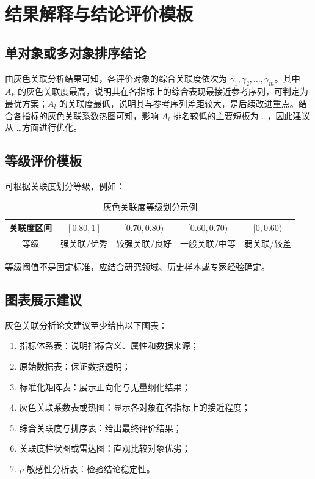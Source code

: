 \documentclass[UTF8,a4paper,11pt]{ctexart}
\begin{document}
\section{结果解释与结论评价模板}
\subsection{单对象或多对象排序结论}
\begin{notebox}[综合排序结论模板]
由灰色关联分析结果可知，各评价对象的综合关联度依次为 $\gamma_1,\gamma_2,\ldots,\gamma_m$。其中 $A_k$ 的灰色关联度最高，说明其在各指标上的综合表现最接近参考序列，可判定为最优方案；$A_l$ 的关联度最低，说明其与参考序列差距较大，是后续改进重点。结合各指标的灰色关联系数热图可知，影响 $A_l$ 排名较低的主要短板为 \ldots，因此建议从 \ldots 方面进行优化。
\end{notebox}

\subsection{等级评价模板}
可根据关联度划分等级，例如：
\begin{table}[h]
\centering
\caption{灰色关联度等级划分示例}
\begin{tabular}{ccccc}
\toprule
关联度区间 & $[0.80,1]$ & $[0.70,0.80)$ & $[0.60,0.70)$ & $[0,0.60)$ \\
\midrule
等级 & 强关联/优秀 & 较强关联/良好 & 一般关联/中等 & 弱关联/较差 \\
\bottomrule
\end{tabular}
\end{table}

等级阈值不是固定标准，应结合研究领域、历史样本或专家经验确定。

\subsection{图表展示建议}
灰色关联分析论文建议至少给出以下图表：
\begin{enumerate}[label=\arabic*)]
  \item 指标体系表：说明指标含义、属性和数据来源；
  \item 原始数据表：保证数据透明；
  \item 标准化矩阵表：展示正向化与无量纲化结果；
  \item 灰色关联系数表或热图：显示各对象在各指标上的接近程度；
  \item 综合关联度与排序表：给出最终评价结果；
  \item 关联度柱状图或雷达图：直观比较对象优劣；
  \item $\rho$ 敏感性分析表：检验结论稳定性。
\end{enumerate}
\end{document}
